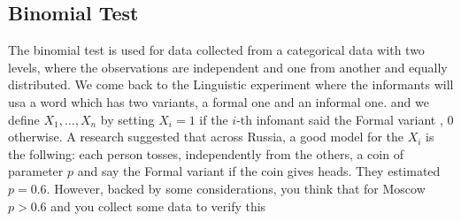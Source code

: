 	\subsection{Binomial Test}

	The binomial test is used for data collected from a categorical data with two levels, where the observations are independent and one from  another and equally distributed. We come back to the Linguistic experiment where the informants will usa a word which has two variants, a formal one and an informal one.  
and we define $X_1, \ldots, X_n $ by setting $X_i = 1 $ if the $i$-th infomant said the Formal variant , 0 otherwise. 
	A research suggested that across Russia, a good model for the $X_i$ is the follwing: each person tosses, independently from the others, a coin of parameter $p$ and say the Formal variant if the coin gives heads. They estimated $p = 0.6$. 
	However, backed by some considerations, you think that for Moscow $p> 0.6$ and you collect some data to verify this

